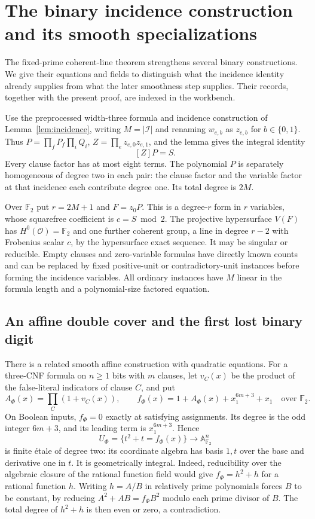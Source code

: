 \section{The binary incidence construction and its smooth specializations}
\label{sec:binary-specializations}
The fixed-prime coherent-line theorem strengthens several binary constructions. We give their equations and fields to distinguish what the incidence identity already supplies from what the later smoothness step supplies. Their records, together with the present proof, are indexed in the workbench.

Use the preprocessed width-three formula and incidence construction of Lemma~\ref{lem:incidence}, writing $M=|\mathcal I|$ and renaming $w_{e,b}$ as $z_{e,b}$ for $b\in\{0,1\}$. Thus $P=\prod_fP_f\prod_iQ_i$, $Z=\prod_ez_{e,0}z_{e,1}$, and the lemma gives the integral identity
\begin{equation}\label{eq:ff-legacy-incidence}
 [Z]P=S.
\end{equation}
Every clause factor has at most eight terms. The polynomial $P$ is separately homogeneous of degree two in each pair: the clause factor and the variable factor at that incidence each contribute degree one. Its total degree is $2M$.

Over $\mathbb F_2$ put $r=2M+1$ and $F=z_0P$. This is a degree-$r$ form in $r$ variables, whose squarefree coefficient is $c=S\bmod2$. The projective hypersurface $V(F)$ has $H^0(\mathcal O)=\mathbb F_2$ and one further coherent group, a line in degree $r-2$ with Frobenius scalar $c$, by the hypersurface exact sequence. It may be singular or reducible. Empty clauses and zero-variable formulas have directly known counts and can be replaced by fixed positive-unit or contradictory-unit instances before forming the incidence variables. All ordinary instances have $M$ linear in the formula length and a polynomial-size factored equation.

\subsection{An affine double cover and the first lost binary digit}
There is a related smooth affine construction with quadratic equations. For a three-CNF formula on $n\geq1$ bits with $m$ clauses, let $v_C(x)$ be the product of the false-literal indicators of clause $C$, and put
\[
 A_\Phi(x)=\prod_C(1+v_C(x)),\qquad
 f_\Phi(x)=1+A_\Phi(x)+x_1^{6m+3}+x_1
 \quad\text{over }\mathbb F_2.
\]
On Boolean inputs, $f_\Phi=0$ exactly at satisfying assignments. Its degree is the odd integer $6m+3$, and its leading term is $x_1^{6m+3}$. Hence
\[
 U_\Phi=\{t^2+t=f_\Phi(x)\}\longrightarrow\mathbb A^n_{\mathbb F_2}
\]
is finite \'etale of degree two: its coordinate algebra has basis $1,t$ over the base and derivative one in $t$. It is geometrically integral. Indeed, reducibility over the algebraic closure of the rational function field would give $f_\Phi=h^2+h$ for a rational function $h$. Writing $h=A/B$ in relatively prime polynomials forces $B$ to be constant, by reducing $A^2+AB=f_\Phi B^2$ modulo each prime divisor of $B$. The total degree of $h^2+h$ is then even or zero, a contradiction.

